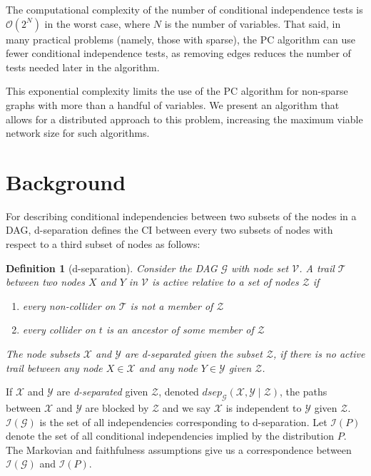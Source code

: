 \documentclass{article}
\newtheorem{definition}{Definition}
\newcommand{\I}{\mathcal{I}}
\newcommand{\Y}{\mathcal{Y}}
\newcommand{\Z}{\mathcal{Z}}
\newcommand{\X}{\mathcal{X}}
\newcommand{\V}{\mathcal{V}}
\newcommand{\T}{\mathcal{T}}
\newcommand{\G}{\mathcal{G}}
\newcommand{\Oo}{\mathcal{O}}
\begin{document}
The computational complexity of the number of conditional independence tests is $\Oo(2^N)$ in the worst case, where $N$ is the number of variables. 
That said, in many practical problems (namely, those with sparse), the PC algorithm 
can use fewer conditional independence tests, as removing edges reduces
the number of tests needed later in the algorithm.

This exponential complexity limits the use of the PC algorithm for non-sparse
graphs with more than a handful of variables. We present an algorithm that
allows for a distributed approach to this problem, increasing the maximum
viable network size for such algorithms.

\section{Background}
For describing conditional independencies between two subsets of the nodes in a DAG, d-separation defines the CI between every two subsets of nodes with respect to a third subset of nodes as follows:
\begin{definition} [d-separation] \label{definition_d-separation}
    Consider the DAG $\G$ with node set $\V$.
    A trail $\T$ between two nodes $X$ and $Y$ in $\V$ is \emph{active} relative to a set of nodes $\Z$ if 
    \begin{enumerate}
    	\item every non-collider on $\T$ is not a member of $\Z$
    	\item every collider on $t$ is an ancestor of some member of $\Z$
    \end{enumerate}
    The node subsets $\X$ and $\Y$ are \emph{d-separated} given the subset $\Z$, if there is no active
    trail between any node $X \in \X$ and any node $Y \in \Y$ given $\Z$.
\end{definition}
If $\X$ and $\Y$ are \emph{d-separated} given $\Z$, denoted $dsep_{\G}(\X,\Y \mid \Z )$, the paths between $\X$ and $\Y$ are blocked by $\Z$ and we say $\X$ is independent to $\Y$ given $\Z$. $\I (\G)$ is the set of all independencies corresponding to d-separation.
Let $\I(P)$ denote the set of all conditional independencies implied by the distribution $P$.
The Markovian and faithfulness assumptions give us a correspondence between $\I(\G)$ and $\I(P)$.
\end{document}
